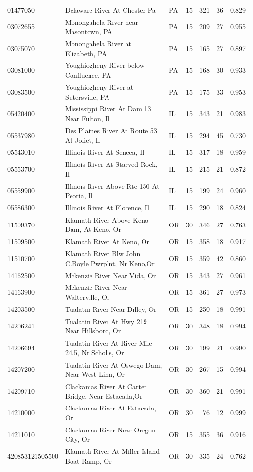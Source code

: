 \documentclass[11pt]{article}
\begin{document}
\begin{longtable}{@{}lp{6.2cm}lrrrr@{}}
01477050 & Delaware River At Chester Pa & PA & 15 & 321 & 36 & 0.829 \\
03072655 & Monongahela River near Masontown, PA & PA & 15 & 209 & 27 & 0.955 \\
03075070 & Monongahela River at Elizabeth, PA & PA & 15 & 165 & 27 & 0.897 \\
03081000 & Youghiogheny River below Confluence, PA & PA & 15 & 168 & 30 & 0.933 \\
03083500 & Youghiogheny River at Sutersville, PA & PA & 15 & 175 & 33 & 0.953 \\
05420400 & Mississippi River At Dam 13 Near Fulton, Il & IL & 15 & 343 & 21 & 0.983 \\
05537980 & Des Plaines River At Route 53 At Joliet, Il & IL & 15 & 294 & 45 & 0.730 \\
05543010 & Illinois River At Seneca, Il & IL & 15 & 317 & 18 & 0.959 \\
05553700 & Illinois River At Starved Rock, Il & IL & 15 & 215 & 21 & 0.872 \\
05559900 & Illinois River Above Rte 150 At Peoria, Il & IL & 15 & 199 & 24 & 0.960 \\
05586300 & Illinois River At Florence, Il & IL & 15 & 290 & 18 & 0.824 \\
11509370 & Klamath River Above Keno Dam, At Keno, Or & OR & 30 & 346 & 27 & 0.763 \\
11509500 & Klamath River At Keno, Or & OR & 15 & 358 & 18 & 0.917 \\
11510700 & Klamath River Blw John C.Boyle Pwrplnt, Nr Keno,Or & OR & 15 & 359 & 42 & 0.860 \\
14162500 & Mckenzie River Near Vida, Or & OR & 15 & 343 & 27 & 0.961 \\
14163900 & Mckenzie River Near Walterville, Or & OR & 15 & 361 & 27 & 0.973 \\
14203500 & Tualatin River Near Dilley, Or & OR & 15 & 250 & 18 & 0.991 \\
14206241 & Tualatin River At Hwy 219 Near Hillsboro, Or & OR & 30 & 348 & 18 & 0.994 \\
14206694 & Tualatin River At River Mile 24.5, Nr Scholls, Or & OR & 30 & 199 & 21 & 0.990 \\
14207200 & Tualatin River At Oswego Dam, Near West Linn, Or & OR & 30 & 267 & 15 & 0.994 \\
14209710 & Clackamas River At Carter Bridge, Near Estacada,Or & OR & 30 & 360 & 21 & 0.991 \\
14210000 & Clackamas River At Estacada, Or & OR & 30 & 76 & 12 & 0.999 \\
14211010 & Clackamas River Near Oregon City, Or & OR & 15 & 355 & 36 & 0.916 \\
420853121505500 & Klamath River At Miller Island Boat Ramp, Or & OR & 30 & 335 & 24 & 0.762 \\
\bottomrule
\end{longtable}
\end{document}
